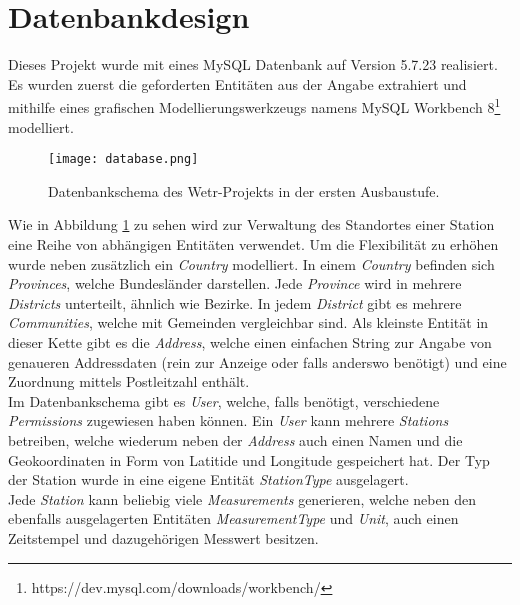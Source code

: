 \section{Datenbankdesign}

Dieses Projekt wurde mit eines MySQL Datenbank auf Version 5.7.23 realisiert. Es wurden zuerst die geforderten Entitäten aus der Angabe extrahiert und mithilfe eines grafischen Modellierungswerkzeugs namens MySQL Workbench 8\footnote{https://dev.mysql.com/downloads/workbench/} modelliert.

\begin{figure}[H]
\centering
\texttt{[image: database.png]}
\caption{Datenbankschema des Wetr-Projekts in der ersten Ausbaustufe.}
\label{fig:db}
\end{figure}
\raggedright
Wie in Abbildung \ref{fig:db} zu sehen wird zur Verwaltung des Standortes einer Station eine Reihe von abhängigen Entitäten verwendet. Um die Flexibilität zu erhöhen wurde neben zusätzlich ein \textit{Country} modelliert. In einem \textit{Country} befinden sich \textit{Provinces}, welche Bundesländer darstellen. Jede \textit{Province} wird in mehrere \textit{Districts} unterteilt, ähnlich wie Bezirke. In jedem \textit{District} gibt es mehrere \textit{Communities}, welche mit Gemeinden vergleichbar sind. Als kleinste Entität in dieser Kette gibt es die \textit{Address}, welche einen einfachen String zur Angabe von genaueren Addressdaten (rein zur Anzeige oder falls anderswo benötigt) und eine Zuordnung mittels Postleitzahl enthält.\\
Im Datenbankschema gibt es \textit{User}, welche, falls benötigt, verschiedene \textit{Permissions} zugewiesen haben können. Ein \textit{User} kann mehrere \textit{Stations} betreiben, welche wiederum neben der \textit{Address} auch einen Namen und die Geokoordinaten in Form von Latitide und Longitude gespeichert hat. Der Typ der Station wurde in eine eigene Entität \textit{StationType} ausgelagert.\\
Jede \textit{Station} kann beliebig viele \textit{Measurements} generieren, welche neben den ebenfalls ausgelagerten Entitäten \textit{MeasurementType} und \textit{Unit}, auch einen Zeitstempel und dazugehörigen Messwert besitzen.\\

